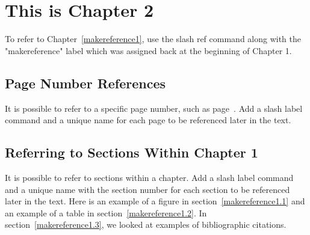 
\cleardoublepage


\chapter{This is Chapter 2}
\label{makereference2}

To refer to Chapter~\ref{makereference1}, use the slash ref command
along with the "makereference" label which was assigned back at the
beginning of Chapter 1.

\section{Page Number References}
\label{makereference2.1} It is possible to refer to a specific page
number, such as page~\pageref{makereference1}.  Add a slash label
command and a unique name for each page to be referenced later in
the text.

\section{Referring to Sections Within Chapter 1}
\label{makereference2.2} It is possible to refer to sections within
a chapter.  Add a slash label command and a unique name with the
section number for each section to be referenced later in the text.
Here is an example of a figure in section~\ref{makereference1.1} and
an example of a table in section~\ref{makereference1.2}.  In
section~\ref{makereference1.3}, we looked at examples of
bibliographic citations.
